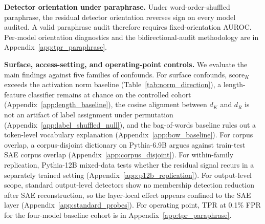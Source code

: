 \textbf{Detector orientation under paraphrase.}
Under word-order-shuffled paraphrase, the residual detector orientation reverses sign on every model audited. A valid paraphrase audit therefore requires fixed-orientation AUROC. Per-model orientation diagnostics and the bidirectional-audit methodology are in Appendix~\ref{app:tpr_paraphrase}.

\textbf{Surface, access-setting, and operating-point controls.}
We evaluate the main findings against five families of confounds. For surface confounds, $\mathrm{score}_K$ exceeds the activation norm baseline (Table~\ref{tab:norm_direction}), a length-feature classifier remains at chance on the controlled cohort (Appendix~\ref{app:length_baseline}), the cosine alignment between $d_K$ and $d_R$ is not an artifact of label assignment under permutation (Appendix~\ref{app:label_shuffled_null}), and the bag-of-words baseline rules out a token-level vocabulary explanation (Appendix~\ref{app:bow_baseline}). For corpus overlap, a corpus-disjoint dictionary on Pythia-6.9B argues against train-test SAE corpus overlap (Appendix~\ref{app:corpus_disjoint}). For within-family replication, Pythia-12B mixed-data tests whether the residual signal recurs in a separately trained setting (Appendix~\ref{app:p12b_replication}). For output-level scope, standard output-level detectors show no membership detection reduction after SAE reconstruction, so the layer-local effect appears confined to the SAE layer (Appendix~\ref{app:standard_probes}). For operating point, TPR at 0.1\% FPR for the four-model baseline cohort is in Appendix~\ref{app:tpr_paraphrase}.
